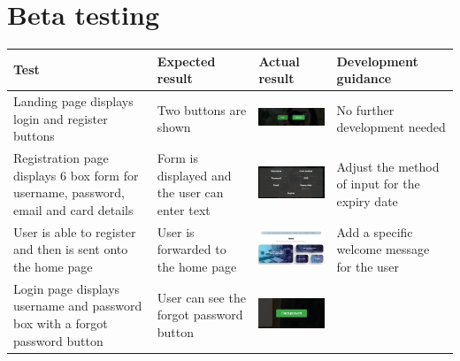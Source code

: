 \section{Beta testing}
\begin{center}
\begin{longtable}{|P{30mm}|P{20mm}|P{60mm}|P{25mm}|}
  \hline
  \textbf{Test} & \textbf{Expected result} & \textbf{Actual result} & \textbf{Development guidance} \\
  \hline
  \endfirsthead
  \hline
  \endhead
  \hline 

  \endfoot
  \endlastfoot

Landing page displays login and register buttons & Two buttons are shown
& \includegraphics[width=57mm]{ch4_testing_for_eval/media/image1.png}
& No further development needed \\ \hline 
Registration page displays 6 box form for username, password, email and
card details & Form is displayed and the user can enter text &
\includegraphics[width=57mm]{ch4_testing_for_eval/media/image2.png} &
Adjust the method of input for the expiry date \\ \hline
User is able to register and then is sent onto the home page & User is
forwarded to the home page &
\includegraphics[width=57mm]{ch4_testing_for_eval/media/image6.png} &
Add a specific welcome message for the user \\ \hline
Login page displays username and password box with a forgot password
button & User can see the forgot password button &
\includegraphics[width=57mm]{ch4_testing_for_eval/media/image11.png}

\end{longtable}
\end{center}
